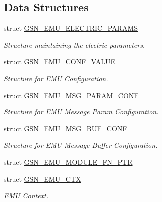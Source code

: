 \subsection*{Data Structures}
\begin{DoxyCompactItemize}
\item 
struct \hyperlink{a00060}{GSN\_\-EMU\_\-ELECTRIC\_\-PARAMS}
\begin{DoxyCompactList}\small\item\em Structure maintaining the electric parameters. \end{DoxyCompactList}\item 
struct \hyperlink{a00058}{GSN\_\-EMU\_\-CONF\_\-VALUE}
\begin{DoxyCompactList}\small\item\em Structure for EMU Configuration. \end{DoxyCompactList}\item 
struct \hyperlink{a00064}{GSN\_\-EMU\_\-MSG\_\-PARAM\_\-CONF}
\begin{DoxyCompactList}\small\item\em Structure for EMU Message Param Configuration. \end{DoxyCompactList}\item 
struct \hyperlink{a00063}{GSN\_\-EMU\_\-MSG\_\-BUF\_\-CONF}
\begin{DoxyCompactList}\small\item\em Structure for EMU Message Buffer Configuration. \end{DoxyCompactList}\item 
struct \hyperlink{a00061}{GSN\_\-EMU\_\-MODULE\_\-FN\_\-PTR}
\item 
struct \hyperlink{a00059}{GSN\_\-EMU\_\-CTX}
\begin{DoxyCompactList}\small\item\em EMU Context. \end{DoxyCompactList}\end{DoxyCompactItemize}
